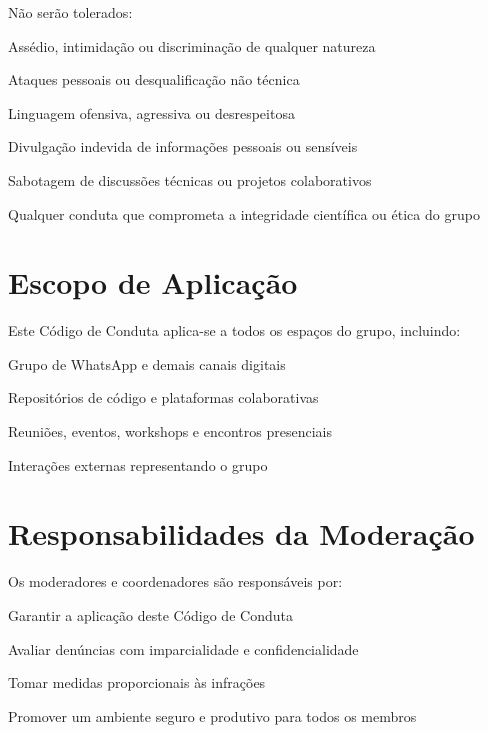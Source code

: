 \documentclass[
  12pt,          %
  a4paper,       %
  oneside,       %
  brazil         %
]{article}
\begin{document}
Não serão tolerados:

\begin{conduta}
  \item Assédio, intimidação ou discriminação de qualquer natureza
  \item Ataques pessoais ou desqualificação não técnica
  \item Linguagem ofensiva, agressiva ou desrespeitosa
  \item Divulgação indevida de informações pessoais ou sensíveis
  \item Sabotagem de discussões técnicas ou projetos colaborativos
  \item Qualquer conduta que comprometa a integridade científica ou ética do grupo
\end{conduta}

\section{Escopo de Aplicação}

Este Código de Conduta aplica-se a todos os espaços do grupo, incluindo:

\begin{conduta}
  \item Grupo de WhatsApp e demais canais digitais
  \item Repositórios de código e plataformas colaborativas
  \item Reuniões, eventos, workshops e encontros presenciais
  \item Interações externas representando o grupo
\end{conduta}

\section{Responsabilidades da Moderação}

Os moderadores e coordenadores são responsáveis por:

\begin{conduta}
  \item Garantir a aplicação deste Código de Conduta
  \item Avaliar denúncias com imparcialidade e confidencialidade
  \item Tomar medidas proporcionais às infrações
  \item Promover um ambiente seguro e produtivo para todos os membros
\end{conduta}
\end{document}
